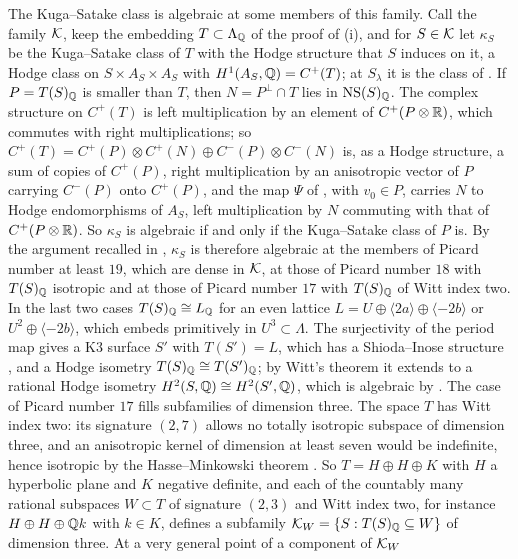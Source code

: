 \begin{remark}
The Kuga--Satake class is algebraic at some members of this family. Call the
family $\mathcal{K}$, keep the embedding $T\subset\Lambda_{\mathbb{Q}}$ of the proof of
(i), and
for $S\in\mathcal{K}$ let $\kappa_{S}$ be the Kuga--Satake class of $T$ with the Hodge
structure that $S$ induces on it, a Hodge class on $S\times A_{S}\times A_{S}$
with $H^{1}(A_{S},\mathbb{Q})=C^{+}(T)$; at $S_{\lambda}$ it is the class of
. If $P=T(S)_{\mathbb{Q}}$ is smaller than $T$, then
$N=P^{\perp}\cap T$ lies in $\mathrm{NS}(S)_{\mathbb{Q}}$. The complex structure on
$C^{+}(T)$ is left multiplication by an element of $C^{+}(P\otimes\mathbb{R})$, which
commutes with right multiplications; so
$C^{+}(T)=C^{+}(P)\otimes C^{+}(N)\oplus C^{-}(P)\otimes C^{-}(N)$ is, as a
Hodge structure, a sum of copies of $C^{+}(P)$, right multiplication by an
anisotropic vector of $P$ carrying $C^{-}(P)$ onto $C^{+}(P)$, and the map
$\Psi$ of , with $v_{0}\in P$, carries $N$ to Hodge
endomorphisms of $A_{S}$, left multiplication by $N$ commuting with that of
$C^{+}(P\otimes\mathbb{R})$. So $\kappa_{S}$ is algebraic if and only if the
Kuga--Satake class of $P$ is. By the argument recalled in
, $\kappa_{S}$ is therefore algebraic at the members of
Picard number at least $19$, which are dense in $\mathcal{K}$, at those of Picard
number $18$ with $T(S)_{\mathbb{Q}}$ isotropic and at those of Picard number $17$
with $T(S)_{\mathbb{Q}}$ of Witt index two. In the last two cases
$T(S)_{\mathbb{Q}}\cong L_{\mathbb{Q}}$ for an even lattice
$L=U\oplus\langle2a\rangle\oplus\langle-2b\rangle$ or
$U^{2}\oplus\langle-2b\rangle$, which embeds primitively in
$U^{3}\subset\Lambda$. The surjectivity of the period map gives a K3 surface
$S'$ with $T(S')=L$, which has a Shioda--Inose structure
\cite[Corollary~6.4]{Mor84}, and a Hodge isometry
$T(S)_{\mathbb{Q}}\cong T(S')_{\mathbb{Q}}$; by Witt's theorem it extends to a rational
Hodge isometry $H^{2}(S,\mathbb{Q})\cong H^{2}(S',\mathbb{Q})$, which is algebraic by
\cite{Bus19}. The case of Picard number $17$
fills subfamilies of dimension three. The space $T$ has Witt index two: its
signature $(2,7)$ allows no totally isotropic subspace of dimension three, and
an anisotropic kernel of dimension at least seven would be indefinite, hence
isotropic by the Hasse--Minkowski theorem \cite{OMe00}. So $T=H\oplus H\oplus
K$ with $H$ a hyperbolic plane and $K$ negative definite, and each of the
countably many rational subspaces $W\subset T$ of signature $(2,3)$ and Witt
index two, for instance $H\oplus H\oplus\mathbb{Q} k$ with $k\in K$, defines a
subfamily $\mathcal{K}_{W}=\{S:T(S)_{\mathbb{Q}}\subseteq W\}$ of dimension three. At a very general point of a component of $\mathcal{K}_{W}$

\end{remark}
